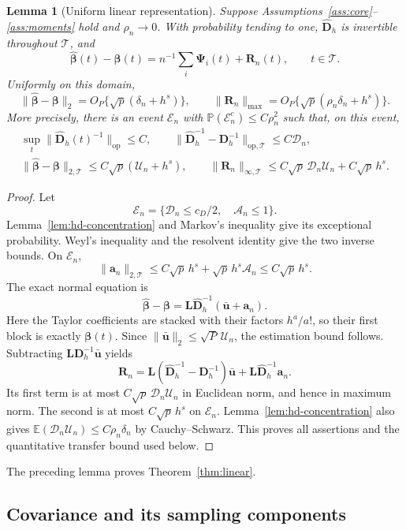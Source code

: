 \documentclass[10pt]{book}
\newtheorem{lemma}{Lemma}
\newcommand{\ba}{{\mathbf a}}
\newcommand{\bu}{{\mathbf u}}
\newcommand{\bD}{{\mathbf D}}
\newcommand{\bL}{{\mathbf L}}
\newcommand{\bR}{{\mathbf R}}
\newcommand{\bbeta}  {\boldsymbol{\beta}}
\newcommand{\bPsi} {\boldsymbol{\Psi}}
\newcommand{\expect}{\mathbb{E}}
\newcommand{\prob}{\mathbb{P}}
\numberwithin{equation}{section}
\begin{document}
\begin{lemma}[Uniform linear representation]\label{lem:hd-linear}
Suppose Assumptions~\ref{ass:core}--\ref{ass:moments} hold and
$\rho_n\to0$. With probability tending to one,
$\widehat{\bD}_h$ is invertible throughout $\mathcal T$, and
\[
\widehat{\bbeta}(t)-\bbeta(t)
=n^{-1}\sum_i\bPsi_i(t)+\bR_n(t),\qquad t\in\mathcal T.
\]
Uniformly on this domain,
\[
\|\widehat{\bbeta}-\bbeta\|_2
=O_P\{\sqrt p(\delta_n+h^s)\},\qquad
\|\bR_n\|_{\max}
=O_P\{\sqrt p(\rho_n\delta_n+h^s)\}.
\]
More precisely, there is an event $\mathcal E_n$ with
$\prob(\mathcal E_n^c)\le C\rho_n^2$ such that, on this event,
\[
\begin{gathered}
\sup_t\|\widehat{\bD}_h(t)^{-1}\|_{\mathrm{op}}\le C,\qquad
\|\widehat{\bD}_h^{-1}-\bD_h^{-1}\|_{\mathrm{op},\mathcal T}
\le C\mathcal D_n,\\
\|\widehat{\bbeta}-\bbeta\|_{2,\mathcal T}
\le C\sqrt p(\mathcal U_n+h^s),\qquad
\|\bR_n\|_{\infty,\mathcal T}
\le C\sqrt p\,\mathcal D_n\mathcal U_n+C\sqrt p\,h^s.
\end{gathered}
\]
\end{lemma}

\begin{proof}
Let
\[
\mathcal E_n=\{\mathcal D_n\le c_D/2,\quad \mathcal A_n\le1\}.
\]
Lemma~\ref{lem:hd-concentration} and Markov's inequality give its
exceptional probability.  Weyl's inequality and the resolvent
identity give the two inverse bounds.  On $\mathcal E_n$,
\[
\|\ba_n\|_{2,\mathcal T}
\le C\sqrt p\,h^s+\sqrt p\,h^s\mathcal A_n
\le C\sqrt p\,h^s.
\]
The exact normal equation is
\[
\widehat{\bbeta}-\bbeta
=\bL\widehat{\bD}_h^{-1}(\bar\bu+\ba_n).
\]
Here the Taylor coefficients are stacked with their factors
$h^a/a!$, so their first block is exactly $\bbeta(t)$.
Since $\|\bar\bu\|_2\le\sqrt P\,\mathcal U_n$, the estimation
bound follows.  Subtracting $\bL\bD_h^{-1}\bar\bu$ yields
\[
\bR_n=\bL(\widehat{\bD}_h^{-1}-\bD_h^{-1})\bar\bu
+\bL\widehat{\bD}_h^{-1}\ba_n.
\]
Its first term is at most $C\sqrt p\,\mathcal D_n\mathcal U_n$ in
Euclidean norm, and hence in maximum norm.  The second is at most
$C\sqrt p\,h^s$ on $\mathcal E_n$. Lemma~\ref{lem:hd-concentration}
also gives
$\expect(\mathcal D_n\mathcal U_n)\le C\rho_n\delta_n$
by Cauchy--Schwarz. This proves all assertions and the quantitative
transfer bound used below.
\end{proof}

The preceding lemma proves Theorem~\ref{thm:linear}.

\subsection{Covariance and its sampling components}\label{app:covariance-proof}
\end{document}
